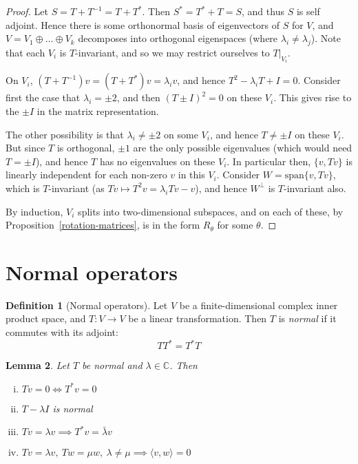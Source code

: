 \documentclass[10pt,fleqn]{article}
\newcommand{\spa}{\mathrm{span}}
\newcommand{\comps}{\mathbb{C}}
\theoremstyle{definition} \newtheorem{defn}{Definition}[section]
\theoremstyle{plain}      \newtheorem{thm}[defn]{Theorem}
\theoremstyle{plain}      \newtheorem{prop}[defn]{Proposition}
\theoremstyle{plain}      \newtheorem{lem}[defn]{Lemma}
\theoremstyle{plain}      \newtheorem{cor}[defn]{Corollary}
\theoremstyle{plain}      \newtheorem{ad}[defn]{Addendum}
\theoremstyle{definition} \newtheorem{ex}[defn]{Example}
\theoremstyle{definition} \newtheorem{rem}[defn]{Remark}
\numberwithin{equation}{subsection}
\begin{document}
\begin{proof}
    Let $S=T+T^{-1}=T+T^*$.
    Then $S^*=T^*+T=S$, and thus $S$ is self adjoint.
    Hence there is some orthonormal basis of eigenvectors of $S$ for $V$, and $V=V_1\oplus\ldots\oplus V_k$ decomposes into orthogonal eigenspaces (where $\lambda_i\neq\lambda_j$).
    Note that each $V_i$ is $T$-invariant, and so we may restrict ourselves to $T|_{V_i}$.

    On $V_i$, $(T+T^{-1})v=(T+T^*)v=\lambda_i v$, and hence $T^2-\lambda_iT+I=0$.
    Consider first the case that $\lambda_i=\pm 2$, and then $(T\pm I)^2=0$ on these $V_i$.
    This gives rise to the $\pm I$ in the matrix representation.

    The other possibility is that $\lambda_i\neq\pm2$ on some $V_i$, and hence $T\neq\pm I$ on these $V_i$.
    But since $T$ is orthogonal, $\pm1$ are the only possible eigenvalues (which would need $T=\pm I$), and hence $T$ has no eigenvalues on these $V_i$.
    In particular then, $\{v,Tv\}$ is linearly independent for each non-zero $v$ in this $V_i$.
    Consider $W=\spa\{v,Tv\}$, which is $T$-invariant (as $Tv\mapsto T^2v=\lambda_iTv-v$), and hence $W^{\perp}$ is $T$-invariant also.

    By induction, $V_i$ splits into two-dimensional subspaces, and on each of these, by Proposition~\ref{rotation-matrices}, is in the form $R_{\theta}$ for some $\theta$.
\end{proof}


\section{Normal operators}

\begin{defn}[Normal operators]
    Let $V$ be a finite-dimensional complex inner product space, and $T:V\to V$ be a linear transformation.
    Then $T$ is \emph{normal} if it commutes with its adjoint:
    \[
        TT^*=
        T^*T
    \]
\end{defn}

\begin{lem}
    Let $T$ be normal and $\lambda\in\comps$.
    Then
    \begin{enumerate}[(i)]
        \item $Tv=0\iff T^*v=0$
        \item $T-\lambda I$ is normal
        \item $Tv=\lambda v\implies T^*v=\bar{\lambda}v$
        \item $Tv=\lambda v,~Tw=\mu w,~\lambda\neq\mu\implies\langle v,w\rangle=0$
    \end{enumerate}
\end{lem}
\end{document}
